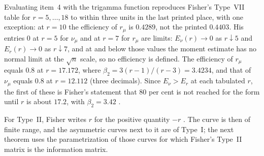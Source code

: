 Evaluating item~4 with the trigamma function reproduces Fisher's Type~VII
table \cite[p.~353]{Fisher1922Foundations} for \(r=5,\ldots,18\) to within
three units in the last printed place, with one exception: at \(r=10\) the
efficiency of \(r_\mu\) is \(0.4289\), not the printed \(0.4403\). His
entries \(0\) at \(r=5\) for \(\nu_\mu\) and at \(r=7\) for \(r_\mu\) are
limits: \(E_\nu(r)\to0\) as \(r\downarrow5\) and \(E_r(r)\to0\) as
\(r\downarrow7\), and at and below those values the moment estimate has no
normal limit at the \(\sqrt n\) scale, so no efficiency is defined. The
efficiency of \(r_\mu\) equals \(0.8\) at \(r=17.172\), where
\(\beta_2=3(r-1)/(r-3)=3.4234\), and that of \(\nu_\mu\) equals \(0.8\) at
\(r=12.112\) (three decimals). Since \(E_\nu>E_r\) at each tabulated
\(r\), the first of these is Fisher's statement that 80 per cent is not
reached for the form until \(r\) is about \(17.2\), with \(\beta_2=3.42\)
\cite[p.~353]{Fisher1922Foundations}.

For Type~II, Fisher writes \(r\) for the positive quantity \(-r\)
\cite[p.~354]{Fisher1922Foundations}. The curve is then of finite range,
and the asymmetric curves next to it are of Type~I; the next theorem uses
the parametrization of those curves for which Fisher's Type~II matrix is
the information matrix.

